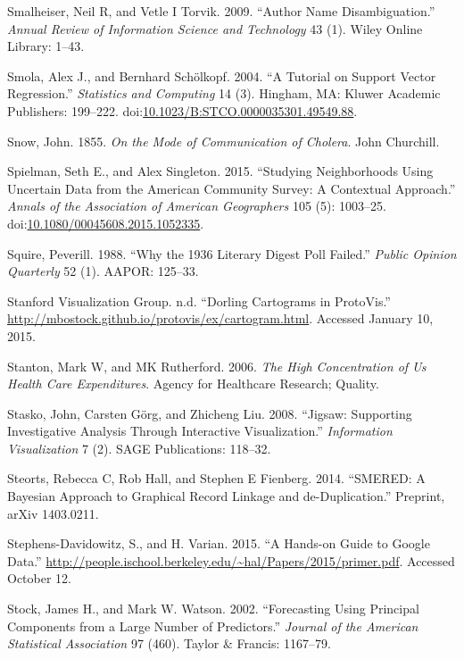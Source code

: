 \documentclass[]{krantz}
\begin{document}
\hypertarget{ref-smalheiser2009author}{}
Smalheiser, Neil R, and Vetle I Torvik. 2009. ``Author Name
Disambiguation.'' \emph{Annual Review of Information Science and
Technology} 43 (1). Wiley Online Library: 1--43.

\hypertarget{ref-SmolaRegression04}{}
Smola, Alex J., and Bernhard Schölkopf. 2004. ``A Tutorial on Support
Vector Regression.'' \emph{Statistics and Computing} 14 (3). Hingham,
MA: Kluwer Academic Publishers: 199--222.
doi:\href{https://doi.org/10.1023/B:STCO.0000035301.49549.88}{10.1023/B:STCO.0000035301.49549.88}.

\hypertarget{ref-snow1855mode}{}
Snow, John. 1855. \emph{On the Mode of Communication of Cholera}. John
Churchill.

\hypertarget{ref-Spielman2015}{}
Spielman, Seth E., and Alex Singleton. 2015. ``Studying Neighborhoods
Using Uncertain Data from the American Community Survey: A Contextual
Approach.'' \emph{Annals of the Association of American Geographers} 105
(5): 1003--25.
doi:\href{https://doi.org/10.1080/00045608.2015.1052335}{10.1080/00045608.2015.1052335}.

\hypertarget{ref-squire19881936}{}
Squire, Peverill. 1988. ``Why the 1936 Literary Digest Poll Failed.''
\emph{Public Opinion Quarterly} 52 (1). AAPOR: 125--33.

\hypertarget{ref-ProtoVis2015}{}
Stanford Visualization Group. n.d. ``Dorling Cartograms in ProtoVis.''
\url{http://mbostock.github.io/protovis/ex/cartogram.html}. Accessed
January 10, 2015.

\hypertarget{ref-stanton2006high}{}
Stanton, Mark W, and MK Rutherford. 2006. \emph{The High Concentration
of Us Health Care Expenditures}. Agency for Healthcare Research;
Quality.

\hypertarget{ref-stasko2008jigsaw}{}
Stasko, John, Carsten Görg, and Zhicheng Liu. 2008. ``Jigsaw: Supporting
Investigative Analysis Through Interactive Visualization.''
\emph{Information Visualization} 7 (2). SAGE Publications: 118--32.

\hypertarget{ref-steorts2014smered}{}
Steorts, Rebecca C, Rob Hall, and Stephen E Fienberg. 2014. ``SMERED: A
Bayesian Approach to Graphical Record Linkage and de-Duplication.''
Preprint, arXiv 1403.0211.

\hypertarget{ref-SDV2015}{}
Stephens-Davidowitz, S., and H. Varian. 2015. ``A Hands-on Guide to
Google Data.''
\url{http://people.ischool.berkeley.edu/~hal/Papers/2015/primer.pdf}.
Accessed October 12.

\hypertarget{ref-stock2002forecasting}{}
Stock, James H., and Mark W. Watson. 2002. ``Forecasting Using Principal
Components from a Large Number of Predictors.'' \emph{Journal of the
American Statistical Association} 97 (460). Taylor \& Francis: 1167--79.
\end{document}
